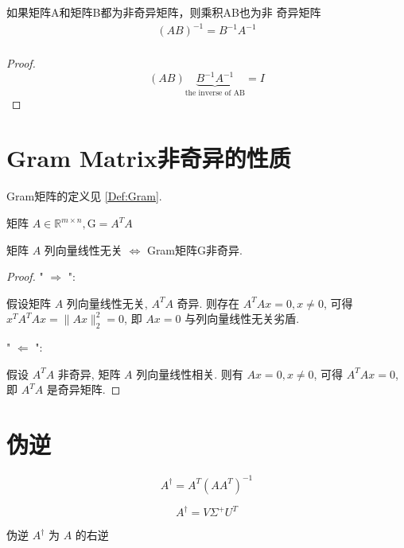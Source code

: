 \begin{corollary}
    如果矩阵A和矩阵B都为非奇异矩阵，则乘积AB也为非 奇异矩阵
$$
\begin{array}{l}
(A B)^{-1}=B^{-1} A^{-1} \\
\end{array}
$$
\end{corollary}

\begin{proof}
    $$(A B) \underbrace{B^{-1} A^{-1}} _{\text{the inverse of AB}}=I$$
\end{proof}

\section{Gram Matrix非奇异的性质}

\label{Sect:GramNonSingular}

Gram矩阵的定义见 \ref{Def:Gram}.

\begin{corollary}
    矩阵 $ A \in \mathbb{R}^{m \times n},  \mathrm{G}=A^{T} A $

矩阵 $ A $ 列向量线性无关 $ \Leftrightarrow $ Gram矩阵G非奇异.
\end{corollary}

\begin{proof}
    " $ \Rightarrow $ ": 
    
    假设矩阵 $ A $ 列向量线性无关, $ A^{T} A $ 奇异.  则存在 $ A^{T} A x=0, x \neq 0 $, 可得 $ x^{T} A^{T} A x=\|A x\|_{2}^{2}=0 $, 即 $ A x=0 $ 与列向量线性无关劣盾.

    " $ \Leftarrow $ ":
    
    假设 $ A^{T} A $ 非奇异, 矩阵 $ A $ 列向量线性相关.  则有 $ A x=0, x \neq 0 $, 可得 $ A^{T} A x=0 $, 即 $ A^{T} A $ 是奇异矩阵. 
\end{proof}

\section{伪逆}

\begin{definition}
    $$ A^{\dagger}=A^{T}\left(A A^{T}\right)^{-1} $$

    $$A^{\dagger} = V \Sigma^+ U^T$$
\end{definition}

\begin{theorem}
    伪逆 $ A^{\dagger} $ 为 $ A $ 的右逆
\end{theorem}

